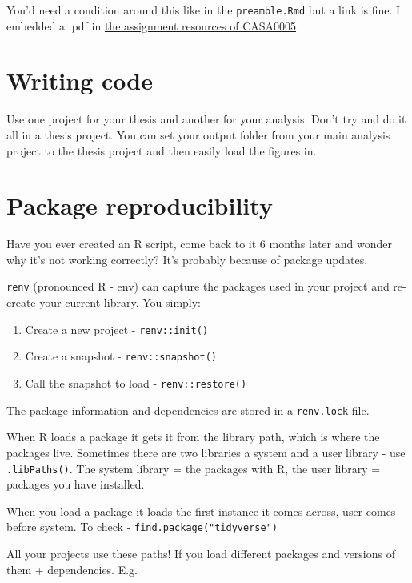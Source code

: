 \documentclass[
  12pt,
  oneside]{book}
\providecommand{\tightlist}{%
  \setlength{\itemsep}{0pt}\setlength{\parskip}{0pt}}
\begin{document}
You'd need a condition around this like in the \texttt{preamble.Rmd} but a link is fine. I embedded a .pdf in \href{https://andrewmaclachlan.github.io/CASA0005repo/assignment-resources-1.html}{the assignment resources of CASA0005}

\hypertarget{writing-code}{%
\section{Writing code}\label{writing-code}}

Use one project for your thesis and another for your analysis. Don't try and do it all in a thesis project. You can set your output folder from your main analysis project to the thesis project and then easily load the figures in.

\hypertarget{package-reproducibility}{%
\section{Package reproducibility}\label{package-reproducibility}}

Have you ever created an R script, come back to it 6 months later and wonder why it's not working correctly? It's probably because of package updates.

\texttt{renv} (pronounced R - env) can capture the packages used in your project and re-create your current library. You simply:

\begin{enumerate}
\def\labelenumi{\arabic{enumi}.}
\tightlist
\item
  Create a new project - \texttt{renv::init()}
\item
  Create a snapshot - \texttt{renv::snapshot()}
\item
  Call the snapshot to load - \texttt{renv::restore()}
\end{enumerate}

The package information and dependencies are stored in a \texttt{renv.lock} file.

When R loads a package it gets it from the library path, which is where the packages live. Sometimes there are two libraries a system and a user library - use \texttt{.libPaths()}. The system library = the packages with R, the user library = packages you have installed.

When you load a package it loads the first instance it comes across, user comes before system. To check - \texttt{find.package("tidyverse")}

All your projects use these paths! If you load different packages and versions of them + dependencies. E.g.
\end{document}
